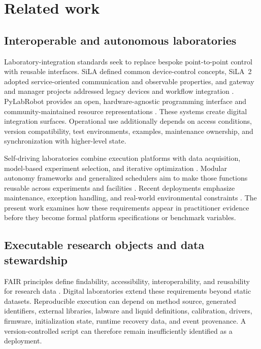 \section{Related work}
\label{sec:related}

\subsection{Interoperable and autonomous laboratories}

Laboratory-integration standards seek to replace bespoke point-to-point control with reusable interfaces. SiLA defined common device-control concepts, SiLA~2 adopted service-oriented communication and observable properties, and gateway and manager projects addressed legacy devices and workflow integration \cite{bar2012sila,juchli2022sila2,porr2020gateway,bromig2022manager}. PyLabRobot provides an open, hardware-agnostic programming interface and community-maintained resource representations \cite{wierenga2023pylabrobot}. These systems create digital integration surfaces. Operational use additionally depends on access conditions, version compatibility, test environments, examples, maintenance ownership, and synchronization with higher-level state.

Self-driving laboratories combine execution platforms with data acquisition, model-based experiment selection, and iterative optimization \cite{abolhasani2023rise,hung2024community}. Modular autonomy frameworks and generalized schedulers aim to make those functions reusable across experiments and facilities \cite{canty2023autonomy,fei2024alabos,cousty2024glas}. Recent deployments emphasize maintenance, exception handling, and real-world environmental constraints \cite{ochiai2025selfmaintainability,robertson2026airfree}. The present work examines how these requirements appear in practitioner evidence before they become formal platform specifications or benchmark variables.

\subsection{Executable research objects and data stewardship}

FAIR principles define findability, accessibility, interoperability, and reusability for research data \cite{wilkinson2016fair}. Digital laboratories extend these requirements beyond static datasets. Reproducible execution can depend on method source, generated identifiers, external libraries, labware and liquid definitions, calibration, drivers, firmware, initialization state, runtime recovery data, and event provenance. A version-controlled script can therefore remain insufficiently identified as a deployment.

